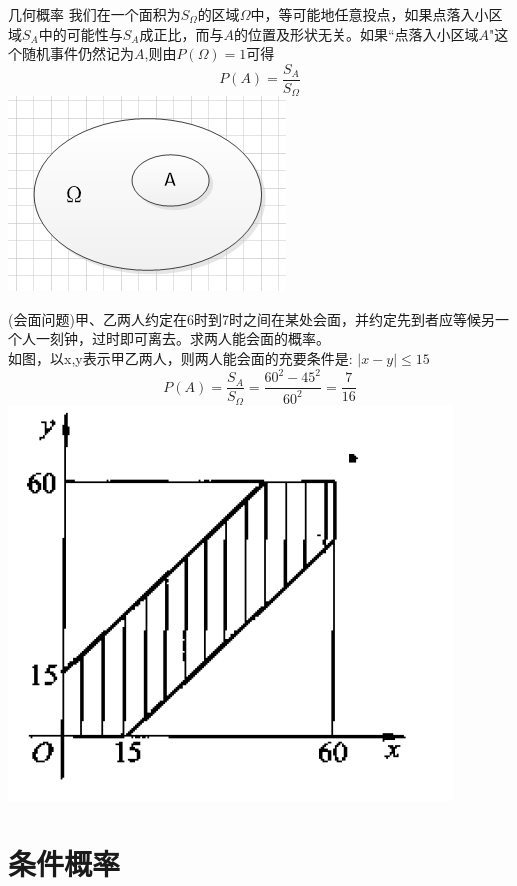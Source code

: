 \begin{frame}{几何概率}
我们在一个面积为$S_\Omega$的区域$\Omega$中，等可能地任意投点，如果点落入小区域$S_A$中的可能性与$S_A$成正比，而与$A$的位置及形状无关。如果``点落入小区域$A$"这个随机事件仍然记为$A$,则由$P(\Omega)=1$可得
$$P(A)=\frac{S_A}{S_\Omega}$$
\includegraphics[scale=0.4]{geometry}
\end{frame}

\begin{frame}
\begin{example}
	(会面问题)甲、乙两人约定在6时到7时之间在某处会面，并约定先到者应等候另一个人一刻钟，过时即可离去。求两人能会面的概率。\\
	如图，以x,y表示甲乙两人，则两人能会面的充要条件是: $|x-y|\leq 15$\\
	$$P(A)=\frac{S_A}{S_\Omega}=\frac{60^2-45^2}{60^2}=\frac{7}{16}$$
	\includegraphics[scale=0.4]{geometry1}
\end{example}
\end{frame}

\section{条件概率}

